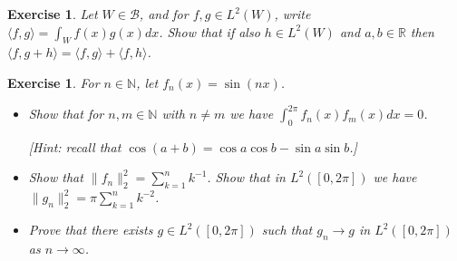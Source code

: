 \documentclass{article}
\newtheorem{exercise}[theorem]{Exercise}
\begin{document}
\begin{exercise}
Let $W \in \mathcal{B}$, and for $f, g \in L^2(W)$, write $\langle f, g \rangle = \int_W f(x)g(x)dx$. Show that if also $h \in L^2(W)$ and $a, b \in \mathbb{R}$ then $\langle f, g + h \rangle = \langle f, g \rangle + \langle f, h \rangle$.
\end{exercise}

\begin{exercise}
For $n \in \mathbb{N}$, let $f_n(x) = \sin(n x)$.
\begin{itemize}
    \item[(a)] Show that for $n, m \in \mathbb{N}$ with $n \neq m$ we have $\int_0^{2\pi} f_n(x) f_m(x)dx = 0$.
    
    \textit{[Hint: recall that $\cos(a + b) = \cos a \cos b - \sin a \sin b$.]}
    
    \item[(b)] Show that $\|f_n\|_2^2 = \sum_{k=1}^{n} k^{-1}$. Show that in $L^2([0,2\pi])$ we have $\|g_n\|_2^2 = \pi \sum_{k=1}^{n} k^{-2}$.
    
    \item[(c)] Prove that there exists $g \in L^2([0,2\pi])$ such that $g_n \to g$ in $L^2([0,2\pi])$ as $n \to \infty$.
\end{itemize}
\end{exercise}
\end{document}
